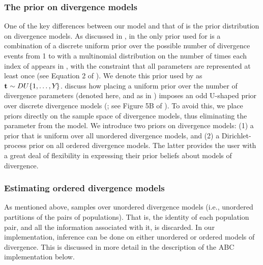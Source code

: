 \documentclass[letterpaper,12pt]{article}
\begin{document}
\begin{linenumbers}
\subsubsection*{The prior on divergence models}
One of the key differences between our model and that of \msb \citep{Huang2011}
is the prior distribution on divergence models.
As discussed in \citet{Oaks2012}, in \msb the only prior used for
\divTimeIndexVector is a combination of a discrete uniform prior over the
possible number of divergence events \divTimeNum from 1 to \npairs{} with a
multinomial distribution on the number of times each index of \divTimeVector
appears in \divTimeIndexVector, with the constraint that all \divTime{}
parameters are represented at least once (see Equation 2 of \citet{Oaks2012}).
We denote this prior used by \msb as $\mathbf{t_{}} \sim DU\{1, \ldots, Y_{}\}$.
\citet{Oaks2012} discuss how placing a uniform prior over the number of
divergence parameters (denoted \divTimeNum here, and as \numt{} in
\citet{Huang2011}) imposes an odd U-shaped prior over discrete divergence
models (\divTimeIndexVector; see
Figure 5B of \citet{Oaks2012}).
To avoid this, we place priors directly on the sample space of divergence
models, thus eliminating the parameter \numt{} from the model.
We introduce two priors on divergence models:
(1) a prior that is uniform over all unordered divergence models, and
(2) a Dirichlet-process prior on all ordered divergence models.
The latter provides the user with a great deal of flexibility in
expressing their prior beliefs about models of divergence.

\subsubsection*{Estimating ordered divergence models}
As mentioned above, \msb samples over unordered divergence models
(i.e., unordered partitions of the \npairs{} pairs of populations).
That is, the identity of each population pair, and all the information
associated with it, is discarded.
In our implementation, inference can be done on either unordered or ordered
models of divergence.
This is discussed in more detail in the description of the ABC implementation
below.


\end{linenumbers}
\end{document}
